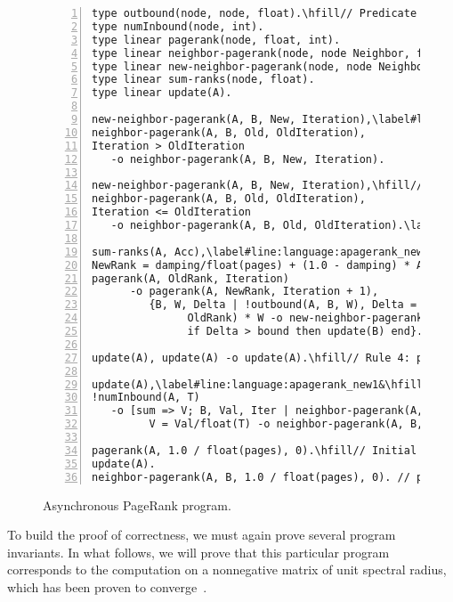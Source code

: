 \begin{figure}[h!]
\begin{Verbatim}[numbers=left,fontsize=\codesize,commandchars=\\\#\&]
type outbound(node, node, float).\hfill// Predicate declaration
type numInbound(node, int).
type linear pagerank(node, float, int).
type linear neighbor-pagerank(node, node Neighbor, float Rank, int Iteration).
type linear new-neighbor-pagerank(node, node Neighbor, float Rank, int Iteration).
type linear sum-ranks(node, float).
type linear update(A).

new-neighbor-pagerank(A, B, New, Iteration),\label#line:language:apagerank_update1&\hfill// Rule 1: update neighbor value
neighbor-pagerank(A, B, Old, OldIteration),
Iteration > OldIteration
   -o neighbor-pagerank(A, B, New, Iteration).

new-neighbor-pagerank(A, B, New, Iteration),\hfill// Rule 2: update neighbor value
neighbor-pagerank(A, B, Old, OldIteration),
Iteration <= OldIteration
   -o neighbor-pagerank(A, B, Old, OldIteration).\label#line:language:apagerank_update2&

sum-ranks(A, Acc),\label#line:language:apagerank_new1&\hfill// Rule 3: propagate new pagerank
NewRank = damping/float(pages) + (1.0 - damping) * Acc,
pagerank(A, OldRank, Iteration)
      -o pagerank(A, NewRank, Iteration + 1),
         {B, W, Delta | !outbound(A, B, W), Delta = fabs(NewRank -
               OldRank) * W -o new-neighbor-pagerank(B, A, NewRank, Iteration + 1),
               if Delta > bound then update(B) end}.\label#line:language:apagerank_new2&

update(A), update(A) -o update(A).\hfill// Rule 4: prune update facts

update(A),\label#line:language:apagerank_new1&\hfill// Rule 5: start update process
!numInbound(A, T)
   -o [sum => V; B, Val, Iter | neighbor-pagerank(A, B, Val, Iter),
         V = Val/float(T) -o neighbor-pagerank(A, B, Val, Iter) -> sum-ranks(A, V)].\label#line:language:apagerank_new2&

pagerank(A, 1.0 / float(pages), 0).\hfill// Initial facts
update(A).
neighbor-pagerank(A, B, 1.0 / float(pages), 0). // pagerank of B is ...
\end{Verbatim}
\caption{Asynchronous PageRank program.}
\label{language:code:async_pagerank}
\end{figure}

To build the proof of correctness, we must again prove several program
invariants. In what follows, we will prove that this particular program
corresponds to the computation on a nonnegative matrix of unit spectral
radius, which has been proven to
converge~\cite{DBLP:journals/corr/abs-cs-0606047,
Lubachevsky:1986:CAA:4904.4801}.

